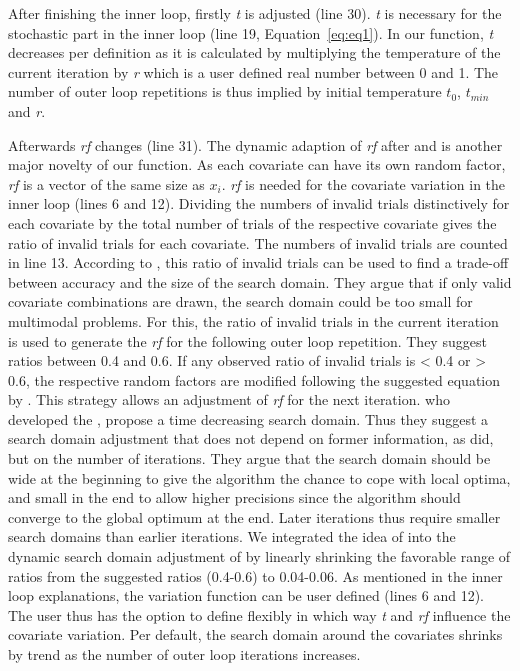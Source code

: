 After finishing the inner loop, firstly \textit{t} is adjusted (line 30).  \textit{t} is necessary for the stochastic part in the inner loop (line 19, Equation~\eqref{eq:eq1}). In our function, \textit{t} decreases per definition as it is calculated by multiplying the temperature of the current iteration by \textit{r} which is a user defined real number between 0 and 1. The number of outer loop repetitions is thus implied by initial temperature $t_0$, $t_{min}$ and \textit{r}.

Afterwards \textit{rf} changes (line 31). The dynamic adaption of \textit{rf} after \citet{corana_1987} and \citet{pronzato_1984} is another major novelty of our function. As each covariate can have its own random factor, \textit{rf} is a vector of the same size as $x_i$. \textit{rf} is needed for the covariate variation in the inner loop (lines 6 and 12). Dividing the numbers of invalid trials distinctively for each covariate by the total number of trials of the respective covariate gives the ratio of invalid trials for each covariate. The numbers of invalid trials are counted in line 13. According to \citep{corana_1987}, this ratio of invalid trials can be used to find a trade-off between accuracy and the size of the search domain. They argue that if only valid covariate combinations are drawn, the search domain could be too small for multimodal problems. For this, the ratio of invalid trials in the current iteration is used to generate the \textit{rf} for the following outer loop repetition. They suggest ratios between 0.4 and 0.6. If any observed ratio of invalid trials is < 0.4 or > 0.6, the respective random factors are modified following the suggested equation by \citet{corana_1987}. This strategy allows an adjustment of \textit{rf} for the next iteration. \citet{pronzato_1984} who developed the , propose a time decreasing search domain. Thus they suggest a search domain adjustment that does not depend on former information, as \citet{corana_1987} did, but on the number of iterations. They argue that the search domain should be wide at the beginning to give the algorithm the chance to cope with local optima, and small in the end to allow higher precisions since the algorithm should converge to the global optimum at the end. Later iterations thus require smaller search domains than earlier iterations. We integrated the idea of \citet{pronzato_1984} into the dynamic search domain adjustment of \citep{corana_1987} by linearly shrinking the favorable range of ratios from the suggested ratios (0.4-0.6) to 0.04-0.06. As mentioned in the inner loop explanations, the variation function can be user defined (lines 6 and 12). The user thus has the option to define flexibly in which way \textit{t} and \textit{rf} influence the covariate variation. Per default, the search domain around the covariates shrinks by trend as the number of outer loop iterations increases.

